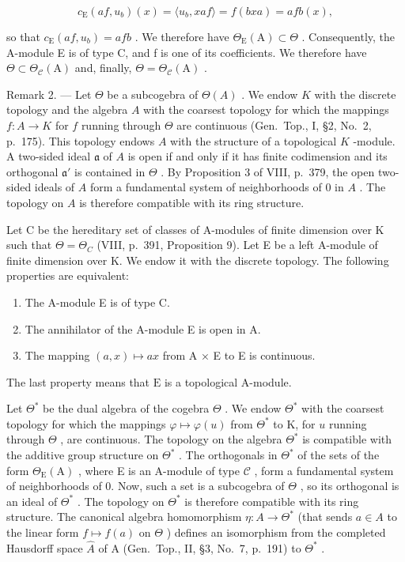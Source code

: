 \[
c _ {\mathrm{E}} (a f, u _ {b}) (x) = \langle u _ {b}, x a f \rangle = f (b x a) = a f b (x),
\]

so that \(c_{\mathrm{E}}(af, u_{b}) = afb\) . We therefore have \(\Theta_{\mathrm{E}}(\mathrm{A}) \subset \Theta\) . Consequently, the A-module E is of type C, and f is one of its coefficients. We therefore have \(\Theta \subset \Theta_{\mathcal{C}}(\mathrm{A})\) and, finally, \(\Theta = \Theta_{\mathcal{C}}(\mathrm{A})\) .

Remark 2. --- Let \(\Theta\) be a subcogebra of \(\Theta(A)\) . We endow \(K\) with the discrete topology and the algebra \(A\) with the coarsest topology for which the mappings \(f: A \to K\) for \(f\) running through \(\Theta\) are continuous (Gen.~Top., I, §2, No.~2, p.~175). This topology endows \(A\) with the structure of a topological \(K\) -module. A two-sided ideal \(\mathfrak{a}\) of \(A\) is open if and only if it has finite codimension and its orthogonal \(\mathfrak{a}'\) is contained in \(\Theta\) . By Proposition 3 of VIII, p.~379, the open two-sided ideals of \(A\) form a fundamental system of neighborhoods of \(0\) in \(A\) . The topology on \(A\) is therefore compatible with its ring structure.

Let C be the hereditary set of classes of A-modules of finite dimension over K such that \(\Theta = \Theta_{C}\) (VIII, p.~391, Proposition 9). Let E be a left A-module of finite dimension over K. We endow it with the discrete topology. The following properties are equivalent:

\begin{enumerate}
\def\labelenumi{(\roman{enumi})}
\item
  The A-module E is of type C.
\item
  The annihilator of the A-module E is open in A.
\item
  The mapping \((a, x) \mapsto ax\) from A × E to E is continuous.
\end{enumerate}

The last property means that \(\mathrm{E}\) is a topological A-module.

Let \(\Theta^{*}\) be the dual algebra of the cogebra \(\Theta\) . We endow \(\Theta^{*}\) with the coarsest topology for which the mappings \(\varphi \mapsto \varphi(u)\) from \(\Theta^{*}\) to K, for \(u\) running through \(\Theta\) , are continuous. The topology on the algebra \(\Theta^{*}\) is compatible with the additive group structure on \(\Theta^{*}\) . The orthogonals in \(\Theta^{*}\) of the sets of the form \(\Theta_{\mathrm{E}}(\mathrm{A})\) , where E is an A-module of type \(\mathcal{C}\) , form a fundamental system of neighborhoods of 0. Now, such a set is a subcogebra of \(\Theta\) , so its orthogonal is an ideal of \(\Theta^{*}\) . The topology on \(\Theta^{*}\) is therefore compatible with its ring structure. The canonical algebra homomorphism \(\eta: A \to \Theta^{*}\) (that sends \(a \in A\) to the linear form \(f \mapsto f(a)\) on \(\Theta\) ) defines an isomorphism from the completed Hausdorff space \(\widehat{A}\) of A (Gen.~Top., II, §3, No.~7, p.~191) to \(\Theta^{*}\) .


